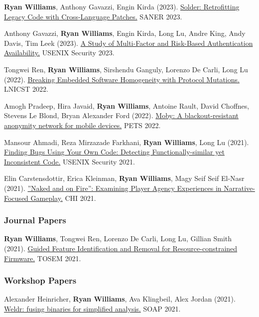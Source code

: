 \documentclass[11pt]{article}
\begin{document}
\textbf{Ryan Williams}, Anthony Gavazzi, Engin Kirda (2023).
\href{https://ieeexplore.ieee.org/abstract/document/10123487}{Solder: Retrofitting Legacy Code with Cross-Language Patches.}
SANER 2023.

Anthony Gavazzi, \textbf{Ryan Williams}, Engin Kirda, Long Lu, Andre King, Andy Davis, Tim Leek (2023).
\href{https://www.usenix.org/system/files/sec23summer_41-gavazzi-prepub.pdf}{A Study of Multi-Factor and Risk-Based Authentication Availability.}
USENIX Security 2023.

Tongwei Ren, \textbf{Ryan Williams}, Sirshendu Ganguly, Lorenzo De Carli, Long Lu (2022).
\href{https://link.springer.com/chapter/10.1007/978-3-031-25538-0_40}{Breaking Embedded Software Homogeneity with Protocol Mutations.}
LNICST 2022.

Amogh Pradeep, Hira Javaid, \textbf{Ryan Williams}, Antoine Rault, David Choffnes, Stevens Le Blond, Bryan Alexander Ford (2022).
\href{https://infoscience.epfl.ch/record/301155}{Moby: A blackout-resistant anonymity network for mobile devices.}
PETS 2022.

Mansour Ahmadi, Reza Mirzazade Farkhani, \textbf{Ryan Williams}, Long Lu (2021).
\href{https://www.usenix.org/system/files/sec21-ahmadi.pdf}{Finding Bugs Using Your Own Code: Detecting Functionally-similar yet Inconsistent Code.}
USENIX Security 2021.

Elin Carstensdottir, Erica Kleinman, \textbf{Ryan Williams}, Magy Seif Seif El-Nasr (2021).
\href{https://dl.acm.org/doi/abs/10.1145/3411764.3445540}{”Naked and on Fire”: Examining Player Agency Experiences in Narrative-Focused Gameplay.}
CHI 2021.

\subsubsection{Journal Papers}
\textbf{Ryan Williams}, Tongwei Ren, Lorenzo De Carli, Long Lu, Gillian Smith (2021).
\href{https://dl.acm.org/doi/full/10.1145/3487568}{Guided Feature Identification and Removal for Resource-constrained Firmware.}
TOSEM 2021.

\subsubsection{Workshop Papers}
Alexander Heinricher, \textbf{Ryan Williams}, Ava Klingbeil, Alex Jordan (2021).
\href{https://dl.acm.org/doi/abs/10.1145/3460946.3464320}{Weldr: fusing binaries for simplified analysis.}
SOAP 2021.
\end{document}
